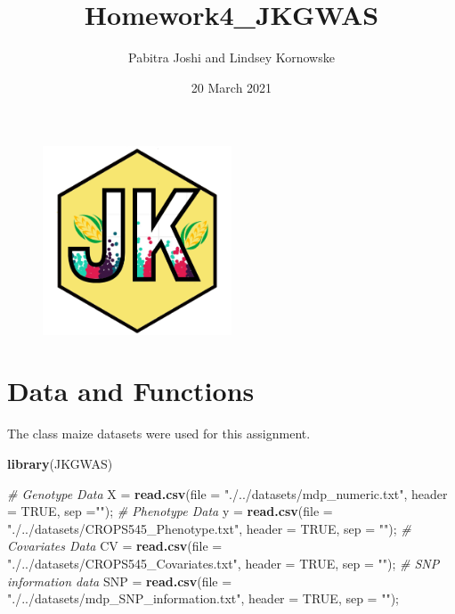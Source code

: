 \documentclass[
]{article}
\title{Homework4\_JKGWAS}
\author{Pabitra Joshi and Lindsey Kornowske}
\date{20 March 2021}
\newenvironment{Shaded}{\begin{snugshade}}{\end{snugshade}}
\newcommand{\CommentTok}[1]{\textcolor[rgb]{0.56,0.35,0.01}{\textit{#1}}}
\newcommand{\DataTypeTok}[1]{\textcolor[rgb]{0.13,0.29,0.53}{#1}}
\newcommand{\KeywordTok}[1]{\textcolor[rgb]{0.13,0.29,0.53}{\textbf{#1}}}
\newcommand{\NormalTok}[1]{#1}
\newcommand{\OtherTok}[1]{\textcolor[rgb]{0.56,0.35,0.01}{#1}}
\newcommand{\StringTok}[1]{\textcolor[rgb]{0.31,0.60,0.02}{#1}}
\begin{document}
\maketitle

{
\setcounter{tocdepth}{6}
\tableofcontents
}
\begin{figure}[htbp]
\begin{center}
\includegraphics[width = 0.5\textwidth]{JKGWAS_logo.png}
\end{center}
\end{figure}

\hypertarget{data-and-functions}{%
\section{Data and Functions}\label{data-and-functions}}

The class maize datasets were used for this assignment.

\begin{Shaded}
\begin{Highlighting}[]
\KeywordTok{library}\NormalTok{(JKGWAS)}

\CommentTok{\# Genotype Data}
\NormalTok{X =}\StringTok{ }\KeywordTok{read.csv}\NormalTok{(}\DataTypeTok{file =} \StringTok{"./../datasets/mdp\_numeric.txt"}\NormalTok{, }\DataTypeTok{header =} \OtherTok{TRUE}\NormalTok{, }\DataTypeTok{sep =}\StringTok{""}\NormalTok{);}
\CommentTok{\# Phenotype Data}
\NormalTok{y =}\StringTok{ }\KeywordTok{read.csv}\NormalTok{(}\DataTypeTok{file =} \StringTok{"./../datasets/CROPS545\_Phenotype.txt"}\NormalTok{, }\DataTypeTok{header =} \OtherTok{TRUE}\NormalTok{, }\DataTypeTok{sep =} \StringTok{""}\NormalTok{);}
\CommentTok{\# Covariates Data}
\NormalTok{CV =}\StringTok{ }\KeywordTok{read.csv}\NormalTok{(}\DataTypeTok{file =} \StringTok{"./../datasets/CROPS545\_Covariates.txt"}\NormalTok{, }\DataTypeTok{header =} \OtherTok{TRUE}\NormalTok{, }\DataTypeTok{sep =} \StringTok{""}\NormalTok{);}
\CommentTok{\# SNP information data}
\NormalTok{SNP =}\StringTok{ }\KeywordTok{read.csv}\NormalTok{(}\DataTypeTok{file =} \StringTok{"./../datasets/mdp\_SNP\_information.txt"}\NormalTok{, }\DataTypeTok{header =} \OtherTok{TRUE}\NormalTok{, }\DataTypeTok{sep =} \StringTok{""}\NormalTok{);}
\end{Highlighting}
\end{Shaded}
\end{document}
